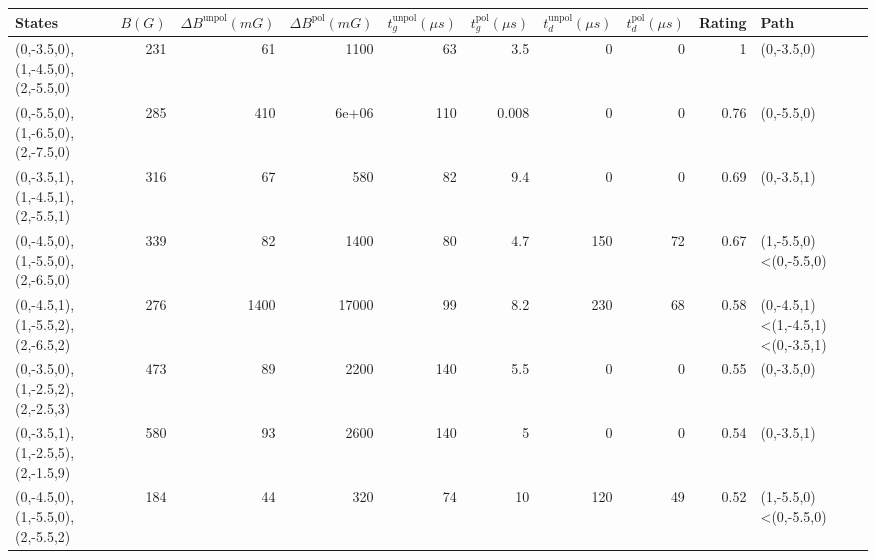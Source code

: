 \begin{tabular}{lrrrrrrrrl}
\hline
 {States}                         &   {$B(G)$} &   {$\Delta B^{\text{unpol}}(mG)$} &   {$\Delta B^{\text{pol}}(mG)$} &   {$t^{\text{unpol}}_{g}(\mu s)$} &   {$t^{\text{pol}}_{g}(\mu s)$} &   {$t^{\text{unpol}}_{d}(\mu s)$} &   {$t^{\text{pol}}_{d}(\mu s)$} &   {Rating} & {Path}                           \\
\hline
 (0,-3.5,0),(1,-4.5,0),(2,-5.5,0) &        231 &                                61 &                        1100     &                                63 &                           3.5   &                                 0 &                               0 &       1    & (0,-3.5,0)                       \\
 (0,-5.5,0),(1,-6.5,0),(2,-7.5,0) &        285 &                               410 &                           6e+06 &                               110 &                           0.008 &                                 0 &                               0 &       0.76 & (0,-5.5,0)                       \\
 (0,-3.5,1),(1,-4.5,1),(2,-5.5,1) &        316 &                                67 &                         580     &                                82 &                           9.4   &                                 0 &                               0 &       0.69 & (0,-3.5,1)                       \\
 (0,-4.5,0),(1,-5.5,0),(2,-6.5,0) &        339 &                                82 &                        1400     &                                80 &                           4.7   &                               150 &                              72 &       0.67 & (1,-5.5,0)<(0,-5.5,0)            \\
 (0,-4.5,1),(1,-5.5,2),(2,-6.5,2) &        276 &                              1400 &                       17000     &                                99 &                           8.2   &                               230 &                              68 &       0.58 & (0,-4.5,1)<(1,-4.5,1)<(0,-3.5,1) \\
 (0,-3.5,0),(1,-2.5,2),(2,-2.5,3) &        473 &                                89 &                        2200     &                               140 &                           5.5   &                                 0 &                               0 &       0.55 & (0,-3.5,0)                       \\
 (0,-3.5,1),(1,-2.5,5),(2,-1.5,9) &        580 &                                93 &                        2600     &                               140 &                           5     &                                 0 &                               0 &       0.54 & (0,-3.5,1)                       \\
 (0,-4.5,0),(1,-5.5,0),(2,-5.5,2) &        184 &                                44 &                         320     &                                74 &                          10     &                               120 &                              49 &       0.52 & (1,-5.5,0)<(0,-5.5,0)            \\
\hline
\end{tabular}